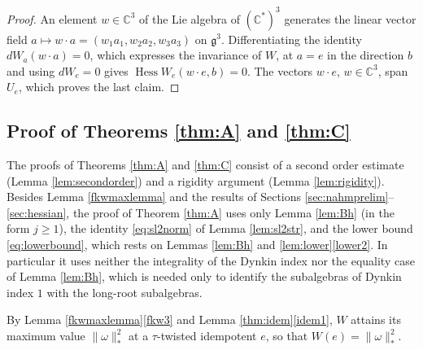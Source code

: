 \documentclass [leqno, 10pt]{amsart}
\theoremstyle{definition}
\numberwithin{equation}{section}
\newcommand{\om}{\omega}
\newcommand{\hess}{\operatorname{Hess}}
\newcommand{\g}{\mathfrak{g}}
\newcommand{\com}{\mathbb C}
\newcommand{\comass}[1]{\lVert #1\rVert_{\ast}}%
\newcommand{\Usp}{U}
\begin{document}
\begin{proof}
An element $w \in \com^{3}$ of the Lie algebra of $(\com^{\ast})^{3}$ generates the linear vector field $a \mapsto w \cdot a = (w_{1}a_{1}, w_{2}a_{2}, w_{3}a_{3})$ on $\g^{3}$. Differentiating the identity $dW_{a}(w \cdot a) = 0$, which expresses the invariance of $W$, at $a = e$ in the direction $b$ and using $dW_{e} = 0$ gives $\hess W_{e}(w \cdot e, b) = 0$. The vectors $w \cdot e$, $w \in \com^{3}$, span $\Usp_{e}$, which proves the last claim.
\end{proof}

\subsection{Proof of Theorems \ref{thm:A} and \ref{thm:C}}\label{sec:sharp}
The proofs of Theorems \ref{thm:A} and \ref{thm:C} consist of a second order estimate (Lemma \ref{lem:secondorder}) and a rigidity argument (Lemma \ref{lem:rigidity}). Besides Lemma \ref{fkwmaxlemma} and the results of Sections \ref{sec:nahmprelim}--\ref{sec:hessian}, the proof of Theorem \ref{thm:A} uses only Lemma \ref{lem:Bh} (in the form $j \geq 1$), the identity \eqref{eq:sl2norm} of Lemma \ref{lem:sl2str}, and the lower bound \eqref{eq:lowerbound}, which rests on Lemmas \ref{lem:Bh} and \ref{lem:lower}\ref{lower2}. In particular it uses neither the integrality of the Dynkin index nor the equality case of Lemma \ref{lem:Bh}, which is needed only to identify the subalgebras of Dynkin index $1$ with the long-root subalgebras.

By Lemma \ref{fkwmaxlemma}\ref{fkw3} and Lemma \ref{thm:idem}\ref{idem1}, $W$ attains its maximum value $\comass{\om}^{2}$ at a $\tau$-twisted idempotent $e$, so that $W(e) = \comass{\om}^{2}$.
\end{document}
